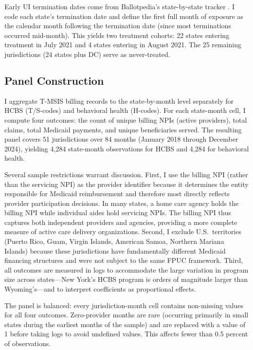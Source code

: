 \documentclass[12pt]{article}
\begin{document}
Early UI termination dates come from Ballotpedia's state-by-state tracker \citep{ballotpedia2021}. I code each state's termination date and define the first full month of exposure as the calendar month following the termination date (since most terminations occurred mid-month). This yields two treatment cohorts: 22 states entering treatment in July 2021 and 4 states entering in August 2021. The 25 remaining jurisdictions (24 states plus DC) serve as never-treated.

\subsection{Panel Construction}

I aggregate T-MSIS billing records to the state-by-month level separately for HCBS (T/S-codes) and behavioral health (H-codes). For each state-month cell, I compute four outcomes: the count of unique billing NPIs (active providers), total claims, total Medicaid payments, and unique beneficiaries served. The resulting panel covers 51 jurisdictions over 84 months (January 2018 through December 2024), yielding 4,284 state-month observations for HCBS and 4,284 for behavioral health.

Several sample restrictions warrant discussion. First, I use the billing NPI (rather than the servicing NPI) as the provider identifier because it determines the entity responsible for Medicaid reimbursement and therefore most directly reflects provider participation decisions. In many states, a home care agency holds the billing NPI while individual aides hold servicing NPIs. The billing NPI thus captures both independent providers and agencies, providing a more complete measure of active care delivery organizations. Second, I exclude U.S.\ territories (Puerto Rico, Guam, Virgin Islands, American Samoa, Northern Mariana Islands) because these jurisdictions have fundamentally different Medicaid financing structures and were not subject to the same FPUC framework. Third, all outcomes are measured in logs to accommodate the large variation in program size across states---New York's HCBS program is orders of magnitude larger than Wyoming's---and to interpret coefficients as proportional effects.

The panel is balanced: every jurisdiction-month cell contains non-missing values for all four outcomes. Zero-provider months are rare (occurring primarily in small states during the earliest months of the sample) and are replaced with a value of 1 before taking logs to avoid undefined values. This affects fewer than 0.5 percent of observations.
\end{document}
